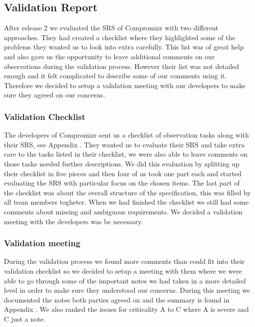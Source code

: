 \documentclass[10pt]{article}
\begin{document}
\subsection{Validation Report}
After release 2 we evaluated the SRS of Compromizr with two different approaches. They had created a checklist where they highlighted some of the problems they wanted us to look into extra carefully. This list was of great help and also gave us the opportunity to leave additional comments on our observations during the validation process. However their list was not detailed enough and it felt complicated to describe some of our comments using it. Therefore we decided to setup a validation meeting with our developers to make sure they agreed on our concerns.

\subsubsection{Validation Checklist}
The developers of Compromizr sent us a checklist of observation tasks along with their SRS, see Appendix \cite{CompromizrChecklist}. They wanted us to evaluate their SRS and take extra care to the tasks listed in their checklist, we were also able to leave comments on those tasks needed further descriptions. We did this evaluation by splitting up their checklist in five pieces and then four of us took one part each and started evaluating the SRS with particular focus on the chosen items. The last part of the checklist was about the overall structure of the specification, this was filled by all team members togheter.
When we had finished the checklist we still had some comments about missing and ambiguous requirements. We decided a validation meeting with the developers was be necessary.

\subsubsection{Validation meeting}
During the validation process we found more comments than could fit into their validation checklist so we decided to setup a meeting with them where we were able to go through some of the important notes we had taken in a more detailed level in order to make sure they understood our concerns. During this meeting we documented the notes both parties agreed on and the summary is found in Appendix \cite{CompromizrValidationMeeting}. We also ranked the issues for criticality A to C where A is severe and C just a note.
\end{document}
